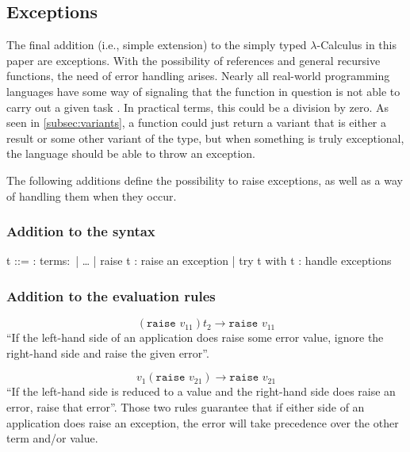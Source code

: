 \subsection{Exceptions}

The final addition (i.e., simple extension) to the
simply typed $\lambda$-Calculus in this paper are exceptions. With the possibility
of references and general recursive functions, the need of
error handling arises. Nearly all real-world programming languages
have some way of signaling that the function in question is not able
to carry out a given task \cite{pierce2002ProgLang}. In practical terms,
this could be a division by zero. As seen in \ref{subsec:variants},
a function could just return a variant that is either a result or
some other variant of the type, but when something is truly exceptional,
the language should be able to throw an exception.

The following additions define the possibility to raise exceptions,
as well as a way of handling them when they occur.

\subsubsection{Addition to the syntax \cite{pierce2002ProgLang}}
\begin{bnfgrammar}
    t ::= : terms$\colon$
    | \dots
    | raise t : raise an exception
    | try t with t : handle exceptions
\end{bnfgrammar}\leavevmode\newline

\subsubsection{Addition to the evaluation rules \cite{pierce2002ProgLang}}
\begin{equation*}
    \tag{Application Raise 1}
    (\texttt{raise } v_{11}) t_2 \rightarrow \texttt{raise } v_{11}
\end{equation*}
``If the left-hand side of an application does raise some error value,
ignore the right-hand side and raise the given error''.

\begin{equation*}
    \tag{Application Raise 2}
    v_1 (\texttt{raise } v_{21}) \rightarrow \texttt{raise } v_{21}
\end{equation*}
``If the left-hand side is reduced to a value and the right-hand side does
raise an error, raise that error''. Those two rules guarantee that 
if either side of an application does raise an exception,
the error will take precedence over the other term and/or value.

